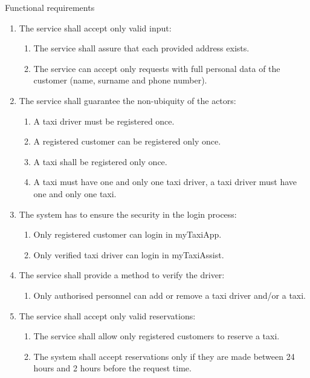 \begin{frame}[allowframebreaks]{Functional requirements}

\begin{enumerate}
	\item The service shall accept only valid input: \begin{enumerate}
		\item The service shall assure that each provided address exists.
		\item The service can accept only requests with full personal data of the customer (name, surname and phone number).
	\end{enumerate}
	
	\item The service shall guarantee the non-ubiquity of the actors: \begin{enumerate}
		\item A taxi driver must be registered once.
		\item A registered customer can be registered only once.
		\item A taxi shall be registered only once.
		\item A taxi must have one and only one taxi driver, a taxi driver must have one and only one taxi.
	\end{enumerate}
	
	\item The system has to ensure the security in the login process: \begin{enumerate}
		\item Only registered customer can login in myTaxiApp.
		\item Only verified taxi driver can login in myTaxiAssist.
	\end{enumerate}
	
	\item The service shall provide a method to verify the driver: \begin{enumerate}
		\item Only authorised personnel can add or remove a taxi driver and/or a taxi.
	\end{enumerate}
	
	\item The service shall accept only valid reservations: \begin{enumerate}
		\item The service shall allow only registered customers to reserve a taxi.
		\item The system shall accept reservations only if they are made between 24 hours and 2 hours before the request time.
	\end{enumerate}
	

\end{enumerate}
\end{frame}
